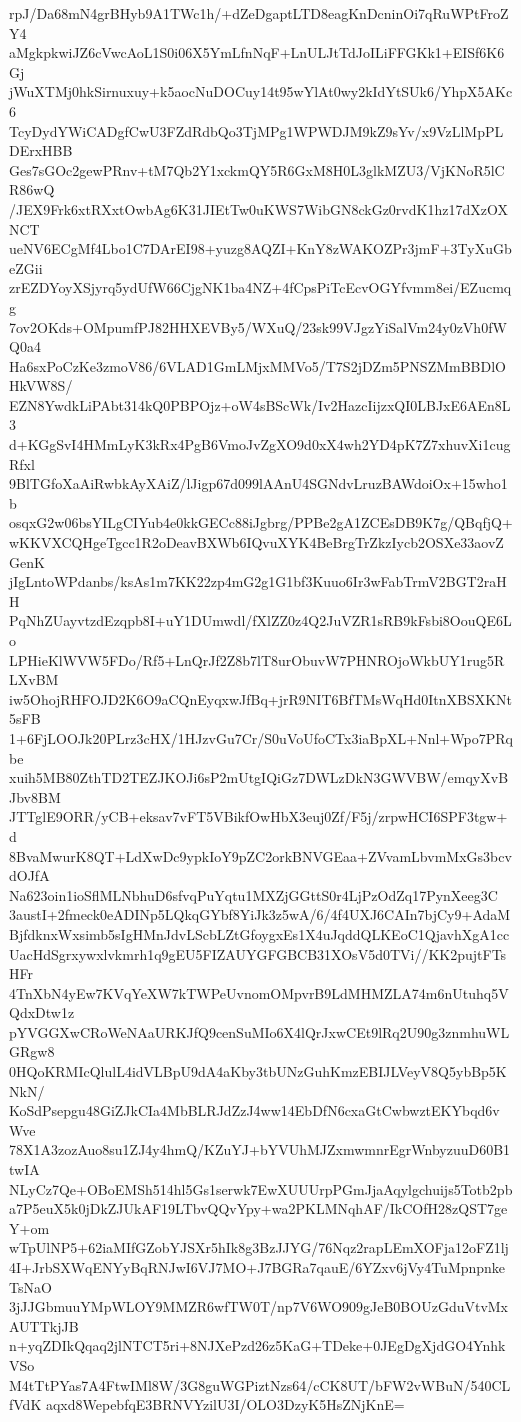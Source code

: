 rpJ/Da68mN4grBHyb9A1TWc1h/+dZeDgaptLTD8eagKnDcninOi7qRuWPtFroZY4
aMgkpkwiJZ6cVwcAoL1S0i06X5YmLfnNqF+LnULJtTdJoILiFFGKk1+EISf6K6Gj
jWuXTMj0hkSirnuxuy+k5aocNuDOCuy14t95wYlAt0wy2kIdYtSUk6/YhpX5AKc6
TcyDydYWiCADgfCwU3FZdRdbQo3TjMPg1WPWDJM9kZ9sYv/x9VzLlMpPLDErxHBB
Ges7sGOc2gewPRnv+tM7Qb2Y1xckmQY5R6GxM8H0L3glkMZU3/VjKNoR5lCR86wQ
/JEX9Frk6xtRXxtOwbAg6K31JIEtTw0uKWS7WibGN8ckGz0rvdK1hz17dXzOXNCT
ueNV6ECgMf4Lbo1C7DArEI98+yuzg8AQZI+KnY8zWAKOZPr3jmF+3TyXuGbeZGii
zrEZDYoyXSjyrq5ydUfW66CjgNK1ba4NZ+4fCpsPiTcEcvOGYfvmm8ei/EZucmqg
7ov2OKds+OMpumfPJ82HHXEVBy5/WXuQ/23sk99VJgzYiSalVm24y0zVh0fWQ0a4
Ha6sxPoCzKe3zmoV86/6VLAD1GmLMjxMMVo5/T7S2jDZm5PNSZMmBBDlOHkVW8S/
EZN8YwdkLiPAbt314kQ0PBPOjz+oW4sBScWk/Iv2HazcIijzxQI0LBJxE6AEn8L3
d+KGgSvI4HMmLyK3kRx4PgB6VmoJvZgXO9d0xX4wh2YD4pK7Z7xhuvXi1cugRfxl
9BlTGfoXaAiRwbkAyXAiZ/lJigp67d099lAAnU4SGNdvLruzBAWdoiOx+15who1b
osqxG2w06bsYILgCIYub4e0kkGECc88iJgbrg/PPBe2gA1ZCEsDB9K7g/QBqfjQ+
wKKVXCQHgeTgcc1R2oDeavBXWb6IQvuXYK4BeBrgTrZkzIycb2OSXe33aovZGenK
jIgLntoWPdanbs/ksAs1m7KK22zp4mG2g1G1bf3Kuuo6Ir3wFabTrmV2BGT2raHH
PqNhZUayvtzdEzqpb8I+uY1DUmwdl/fXlZZ0z4Q2JuVZR1sRB9kFsbi8OouQE6Lo
LPHieKlWVW5FDo/Rf5+LnQrJf2Z8b7lT8urObuvW7PHNROjoWkbUY1rug5RLXvBM
iw5OhojRHFOJD2K6O9aCQnEyqxwJfBq+jrR9NIT6BfTMsWqHd0ItnXBSXKNt5sFB
1+6FjLOOJk20PLrz3cHX/1HJzvGu7Cr/S0uVoUfoCTx3iaBpXL+Nnl+Wpo7PRqbe
xuih5MB80ZthTD2TEZJKOJi6sP2mUtgIQiGz7DWLzDkN3GWVBW/emqyXvBJbv8BM
JTTglE9ORR/yCB+eksav7vFT5VBikfOwHbX3euj0Zf/F5j/zrpwHCI6SPF3tgw+d
8BvaMwurK8QT+LdXwDc9ypkIoY9pZC2orkBNVGEaa+ZVvamLbvmMxGs3bcvdOJfA
Na623oin1ioSflMLNbhuD6sfvqPuYqtu1MXZjGGttS0r4LjPzOdZq17PynXeeg3C
3austI+2fmeck0eADINp5LQkqGYbf8YiJk3z5wA/6/4f4UXJ6CAIn7bjCy9+AdaM
BjfdknxWxsimb5sIgHMnJdvLScbLZtGfoygxEs1X4uJqddQLKEoC1QjavhXgA1cc
UacHdSgrxywxlvkmrh1q9gEU5FIZAUYGFGBCB31XOsV5d0TVi//KK2pujtFTsHFr
4TnXbN4yEw7KVqYeXW7kTWPeUvnomOMpvrB9LdMHMZLA74m6nUtuhq5VQdxDtw1z
pYVGGXwCRoWeNAaURKJfQ9cenSuMIo6X4lQrJxwCEt9lRq2U90g3znmhuWLGRgw8
0HQoKRMIcQlulL4idVLBpU9dA4aKby3tbUNzGuhKmzEBIJLVeyV8Q5ybBp5KNkN/
KoSdPsepgu48GiZJkCIa4MbBLRJdZzJ4ww14EbDfN6cxaGtCwbwztEKYbqd6vWve
78X1A3zozAuo8su1ZJ4y4hmQ/KZuYJ+bYVUhMJZxmwmnrEgrWnbyzuuD60B1twIA
NLyCz7Qe+OBoEMSh514hl5Gs1serwk7EwXUUUrpPGmJjaAqylgchuijs5Totb2pb
a7P5euX5k0jDkZJUkAF19LTbvQQvYpy+wa2PKLMNqhAF/IkCOfH28zQST7geY+om
wTpUlNP5+62iaMIfGZobYJSXr5hIk8g3BzJJYG/76Nqz2rapLEmXOFja12oFZ1lj
4I+JrbSXWqENYyBqRNJwI6VJ7MO+J7BGRa7qauE/6YZxv6jVy4TuMpnpnkeTsNaO
3jJJGbmuuYMpWLOY9MMZR6wfTW0T/np7V6WO909gJeB0BOUzGduVtvMxAUTTkjJB
n+yqZDIkQqaq2jlNTCT5ri+8NJXePzd26z5KaG+TDeke+0JEgDgXjdGO4YnhkVSo
M4tTtPYas7A4FtwIMl8W/3G8guWGPiztNzs64/cCK8UT/bFW2vWBuN/540CLfVdK
aqxd8WepebfqE3BRNVYzilU3I/OLO3DzyK5HsZNjKnE=
